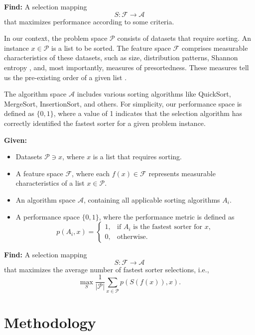 \documentclass[twocolumn]{article}
\newcommand{\vsp}{\vspace{0.5em}}
\begin{document}
\noindent \textbf{Find:} A selection mapping 
\[
S: \mathcal{F} \rightarrow \mathcal{A}
\]
that maximizes performance according to some criteria.

\vsp

In our context, the problem space $\mathcal{P}$ consists of datasets that require sorting. An instance $x \in \mathcal{P}$ is a list to be sorted. The feature space $\mathcal{F}$ comprises measurable characteristics of these datasets, such as size, distribution patterns, Shannon entropy \cite{shannonentropy}, and, most importantly, measures of presortedness. These measures tell us the pre-existing order of a given list \cite{Mannila1985MeasuresOP}.

The algorithm space $\mathcal{A}$ includes various sorting algorithms like QuickSort, MergeSort, InsertionSort, and others. For simplicity, our performance space is defined as $\{0,1\}$, where a value of 1 indicates that the selection algorithm has correctly identified the fastest sorter for a given problem instance.

\vsp

\noindent \textbf{Given:}
\begin{itemize}
    \item Datasets $\mathcal{P} \ni x$, where $x$ is a list that requires sorting.
    \item A feature space $\mathcal{F}$, where each $f(x) \in \mathcal{F}$ represents measurable characteristics of a list $x \in \mathcal{P}$.
    \item An algorithm space $\mathcal{A}$, containing all applicable sorting algorithms $A_i$.
    \item A performance space $\{0,1\}$, where the performance metric is defined as
    \[
    p(A_i, x) = 
    \begin{cases}
    1, & \text{if } A_i \text{ is the fastest sorter for } x, \\
    0, & \text{otherwise.}
    \end{cases}
    \]
\end{itemize}

\noindent \textbf{Find:} A selection mapping
\[
S: \mathcal{F} \rightarrow \mathcal{A}
\]
that maximizes the average number of fastest sorter selections, i.e.,
\[
\max_{S} \frac{1}{|\mathcal{P}|} \sum_{x \in \mathcal{P}} p(S(f(x)), x).
\]


\section{Methodology}
\end{document}
